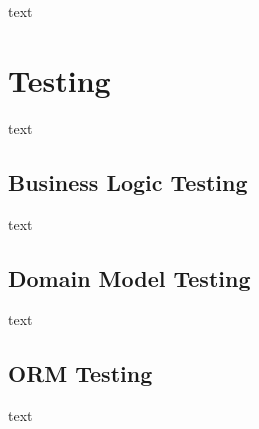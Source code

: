 \documentclass[11pt]{article}
\begin{document}
            text

    \section{Testing} \label{sec:testing}

        text

        \subsection{Business Logic Testing} \label{subsec:business-logic-testing}

            text

        \subsection{Domain Model Testing} \label{subsec:domain-model-testing}

            text

        \subsection{ORM Testing} \label{subsec:orm-testing}

            text
\end{document}
